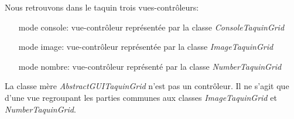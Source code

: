 	Nous retrouvons dans le taquin trois vues-contrôleurs:


	\begin{itemize}
		\item [mode console:] vue-contrôleur représentée par la classe \textit{ConsoleTaquinGrid}
		\item [mode image:] vue-contrôleur représentée par la classe \textit{ImageTaquinGrid}
		\item [mode nombre:] vue-contrôleur représenté par la classe \textit{NumberTaquinGrid}
	\end{itemize}

	La classe mère \textit{AbstractGUITaquinGrid} n'est pas un contrôleur. Il ne s'agit que d'une vue regroupant les parties communes aux classes \textit{ImageTaquinGrid} et \textit{NumberTaquinGrid}.
